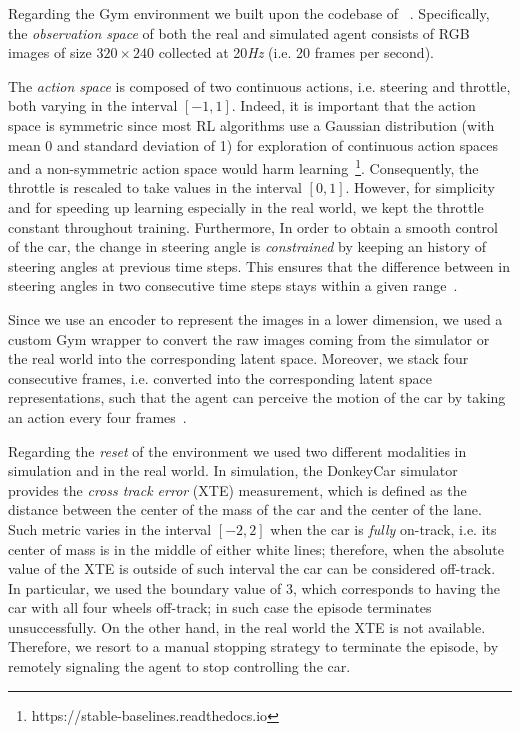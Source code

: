 Regarding the Gym environment we built upon the codebase of ~\cite{learning-to-drive-in-5-minutes}. Specifically, the \textit{observation space} of both the real and simulated agent consists of RGB images of size $320 \times 240$ collected at 20\textit{Hz} (i.e. 20 frames per second). 

The \textit{action space} is composed of two continuous actions, i.e. steering and throttle, both varying in the interval $[-1, 1]$. Indeed, it is important that the action space is symmetric since most RL algorithms use a Gaussian distribution (with mean 0 and standard deviation of 1) for exploration of continuous action spaces and a non-symmetric action space would harm learning~\footnote{https://stable-baselines.readthedocs.io}. Consequently, the throttle is rescaled to take values in the interval $[0, 1]$. However, for simplicity and for speeding up learning especially in the real world, we kept the throttle constant throughout training. Furthermore, In order to obtain a smooth control of the car, the change in steering angle is \textit{constrained} by keeping an history of steering angles at previous time steps. This ensures that the difference between in steering angles in two consecutive time steps stays within a given range~\cite{learning-to-drive-in-5-minutes}.

Since we use an encoder to represent the images in a lower dimension, we used a custom Gym wrapper to convert the raw images coming from the simulator or the real world into the corresponding latent space. Moreover, we stack four consecutive frames, i.e. converted into the corresponding latent space representations, such that the agent can perceive the motion of the car by taking an action every four frames~\cite{dqn}.

Regarding the \textit{reset} of the environment we used two different modalities in simulation and in the real world. In simulation, the DonkeyCar simulator provides the \textit{cross track error} (XTE) measurement, which is defined as the distance between the center of the mass of the car and the center of the lane. Such metric varies in the interval $[-2, 2]$ when the car is \textit{fully} on-track, i.e. its center of mass is in the middle of either white lines; therefore, when the absolute value of the XTE is outside of such interval the car can be considered off-track. In particular, we used the boundary value of $3$, which corresponds to having the car with all four wheels off-track; in such case the episode terminates unsuccessfully. On the other hand, in the real world the XTE is not available. Therefore, we resort to a manual stopping strategy to terminate the episode, by remotely signaling the agent to stop controlling the car.

